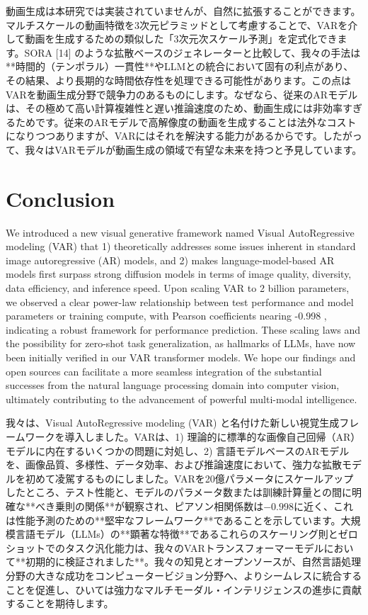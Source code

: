 \documentclass{article}
\begin{document}
動画生成は本研究では実装されていませんが、自然に拡張することができます。マルチスケールの動画特徴を3次元ピラミッドとして考慮することで、VARを介して動画を生成するための類似した「3次元次スケール予測」を定式化できます。SORA [14] のような拡散ベースのジェネレーターと比較して、我々の手法は**時間的（テンポラル）一貫性**やLLMとの統合において固有の利点があり、その結果、より長期的な時間依存性を処理できる可能性があります。この点はVARを動画生成分野で競争力のあるものにします。なぜなら、従来のARモデルは、その極めて高い計算複雑性と遅い推論速度のため、動画生成には非効率すぎるためです。従来のARモデルで高解像度の動画を生成することは法外なコストになりつつありますが、VARにはそれを解決する能力があるからです。したがって、我々はVARモデルが動画生成の領域で有望な未来を持つと予見しています。

\section{Conclusion}
We introduced a new visual generative framework named Visual AutoRegressive modeling (VAR) that 1) theoretically addresses some issues inherent in standard image autoregressive (AR) models, and 2) makes language-model-based AR models first surpass strong diffusion models in terms of image quality, diversity, data efficiency, and inference speed. Upon scaling VAR to 2 billion parameters, we observed a clear power-law relationship between test performance and model parameters or training compute, with Pearson coefficients nearing -0.998 , indicating a robust framework for performance prediction. These scaling laws and the possibility for zero-shot task generalization, as hallmarks of LLMs, have now been initially verified in our VAR transformer models. We hope our findings and open sources can facilitate a more seamless integration of the substantial successes from the natural language processing domain into computer vision, ultimately contributing to the advancement of powerful multi-modal intelligence.

我々は、Visual AutoRegressive modeling (VAR) と名付けた新しい視覚生成フレームワークを導入しました。VARは、1) 理論的に標準的な画像自己回帰（AR）モデルに内在するいくつかの問題に対処し、2) 言語モデルベースのARモデルを、画像品質、多様性、データ効率、および推論速度において、強力な拡散モデルを初めて凌駕するものにしました。VARを20億パラメータにスケールアップしたところ、テスト性能と、モデルのパラメータ数または訓練計算量との間に明確な**べき乗則の関係**が観察され、ピアソン相関係数は$-0.998$に近く、これは性能予測のための**堅牢なフレームワーク**であることを示しています。大規模言語モデル（LLMs）の**顕著な特徴**であるこれらのスケーリング則とゼロショットでのタスク汎化能力は、我々のVARトランスフォーマーモデルにおいて**初期的に検証されました**。我々の知見とオープンソースが、自然言語処理分野の大きな成功をコンピュータービジョン分野へ、よりシームレスに統合することを促進し、ひいては強力なマルチモーダル・インテリジェンスの進歩に貢献することを期待します。
\end{document}
